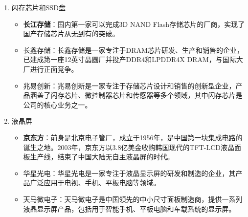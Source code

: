 \documentclass[UTF8]{report}
\begin{document}
\begin{enumerate}[label=(\arabic*)]
\item {闪存芯片和SSD盘}
    \begin{itemize}
    \item \textbf{长江存储}：国内第一家可以完成3D NAND Flash存储芯片的厂商，实现了国产存储芯片从无到有的突破。
    \item 长鑫存储：长鑫存储是一家专注于DRAM芯片研发、生产和销售的企业，已建成第一座12英寸晶圆厂并投产DDR4和LPDDR4X DRAM，与国际大厂进行正面竞争。
    \item 兆易创新：兆易创新是一家专注于存储芯片设计和销售的创新型企业，产品涵盖了闪存芯片、微控制器芯片和传感器等多个领域，其中闪存芯片是公司的核心业务之一。
    \end{itemize}

\item {液晶屏}
    \begin{itemize}
        \item \textbf{京东方}：前身是北京电子管厂，成立于1956年，是中国第一块集成电路的诞生之地。2003年，京东方以3.8亿美金收购韩国现代的TFT-LCD液晶面板生产线，结束了中国大陆无自主液晶屏的时代。
        \item 华星光电：华星光电是一家专注于液晶显示屏的研发和制造的企业，其产品广泛应用于电视、手机、平板电脑等领域。
        \item 天马微电子：天马微电子是中国领先的中小尺寸面板制造商，提供一系列液晶显示屏产品，包括用于智能手机、平板电脑和车载系统的显示屏。
    \end{itemize}
\end{enumerate}
\end{document}
